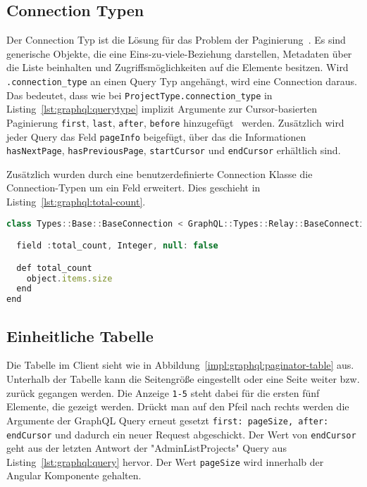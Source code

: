\subsection{Connection Typen}
\label{graphql:connections}
Der Connection Typ ist die Lösung für das Problem der Paginierung~\cite{graphql-connection-concept}.
Es sind generische Objekte, die eine Eins-zu-viele-Beziehung darstellen, Metadaten über die Liste beinhalten und Zugriffsmöglichkeiten auf die Elemente besitzen.
Wird \texttt{.con\-nection\-\_type} an einen Query Typ angehängt, wird eine Connection daraus. 
Das bedeutet, dass wie bei \texttt{ProjectType.connection\_type} in Listing~\ref{lst:graphql:querytype} implizit Argumente zur Cursor-basierten Paginierung \texttt{first}, \texttt{last}, \texttt{after}, \texttt{before} hinzugefügt~\cite{graphql-relay-connection} werden. Zusätzlich wird jeder Query das Feld \texttt{pageInfo} beigefügt, über das die Informationen \texttt{hasNextPage}, \texttt{hasPreviousPage}, \texttt{startCursor} und \texttt{endCursor} erhältlich sind. 

Zusätzlich wurden durch eine benutzerdefinierte Connection Klasse die Connection-Typen um ein Feld erweitert.
Dies geschieht in Listing~\ref{lst:graphql:total-count}.

\begin{lstlisting}[language=JavaScript,float=h!,caption={Benutzerdefinierte Connection Klasse mit hinzugefügtem Feld}, label={lst:graphql:total-count}]
class Types::Base::BaseConnection < GraphQL::Types::Relay::BaseConnection

  field :total_count, Integer, null: false

  def total_count
    object.items.size
  end
end
\end{lstlisting}

\subsection{Einheitliche Tabelle}
\label{impl:paginator-component}
Die Tabelle im Client sieht wie in Abbildung~\ref{impl:graphql:paginator-table} aus. Unterhalb der Tabelle kann die Seitengröße eingestellt oder eine Seite weiter bzw. zurück gegangen werden. Die Anzeige \texttt{1-5} steht dabei für die ersten fünf Elemente, die gezeigt werden. Drückt man auf den Pfeil nach rechts werden die Argumente der GraphQL Query erneut gesetzt \texttt{{first: pageSize, after: endCursor}} und dadurch ein neuer Request abgeschickt.
Der Wert von \texttt{endCursor} geht aus der letzten Antwort der "AdminListProjects" Query aus Listing~\ref{lst:graphql:query} hervor. Der Wert \texttt{pageSize} wird innerhalb der Angular Komponente gehalten. 

